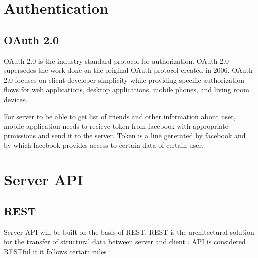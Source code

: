 \section{Authentication}
\subsection{OAuth 2.0}
OAuth 2.0 is the industry-standard protocol for authorization. OAuth 2.0 supersedes the work done on the original OAuth
protocol created in 2006. OAuth 2.0 focuses on client developer simplicity while providing specific authorization flows
for web applications, desktop applications, mobile phones, and living room devices. \cite{oauth}

For server to be able to get list of friends and other information about user, mobile application needs to recieve
token from facebook with appropriate prmissions and send it to the server. Token is a line generated by facebook and
by which facebook provides access to certain data of certain user.



\newcommand{\ritem}[1]{
    \item \textbf{#1} \par
}
\section{Server API}

\subsection{REST}
Server API will be built on the basis of \ac{REST}. \ac{REST} is the architectural solution for the transfer of
structural data between server and client \cite{rest}.
API is considered RESTful if it follows certain rules \cite{whatisrest}:

